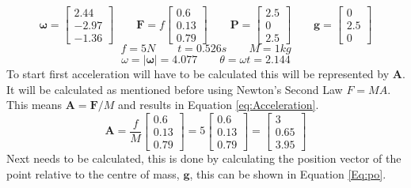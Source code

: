 \begin{equation}\label{var:Rotation Variables}
	\boldsymbol{\omega} = 
	\begin{bmatrix}
		 2.44 \\
		-2.97 \\
		-1.36 
	\end{bmatrix}
	\qquad
	\mathbf{F} = f
	\begin{bmatrix}
		 0.6  \\
		 0.13 \\
		 0.79 
	\end{bmatrix}
	\qquad
	\mathbf{P}= 
	\begin{bmatrix}
		2.5 \\
		0 	 \\
		2.5 
	\end{bmatrix}
	\qquad
	\mathbf{g} = 
	\begin{bmatrix}
		0 \\
	 	2.5 	 \\
		0 
	\end{bmatrix}
\end{equation}
\begin{equation}\label{var:ftm}
	f = 5N
	\qquad
	t = 0.526s
	\qquad
	M = 1kg
\end{equation}
\begin{equation}\label{var:thetaomega}
	\omega = |\boldsymbol\omega| = 4.077
	\qquad
	\theta = \omega t = 2.144
\end{equation}
To start first acceleration will have to be calculated this will be represented by $\mathbf{A}$.
It will be calculated as mentioned before using Newton’s Second Law $F=MA$.
This means $\mathbf{A} = \mathbf{F}/M$ and results in Equation \ref{eq:Acceleration}.
\begin{equation}\label{eq:Acceleration}
	\mathbf{A} = \frac{f}{M}
	\begin{bmatrix}
		 0.6  \\
		 0.13 \\
		 0.79 
	\end{bmatrix} = 5
	\begin{bmatrix}
		 0.6  \\
		 0.13 \\
		 0.79 
	\end{bmatrix} = 
	\begin{bmatrix}
		 3  \\
		 0.65 \\
		 3.95 
	\end{bmatrix}
\end{equation}
Next needs to be calculated, this is done by calculating the position vector of the point relative to the centre of mass,  $\mathbf{g}$, this can be shown in Equation \ref{Eq:po}.
